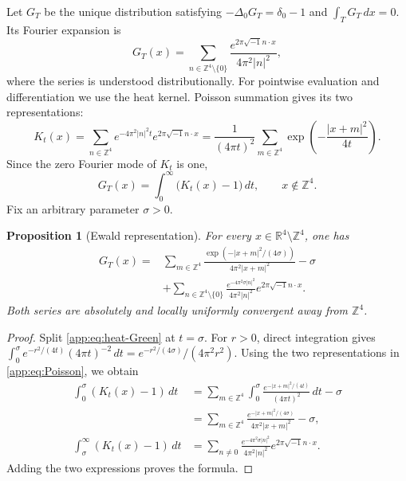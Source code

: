 \documentclass[11pt,a4paper,twoside]{article}
\numberwithin{equation}{section}
\newtheorem{proposition}[theorem]{Proposition}
\theoremstyle{definition}
\theoremstyle{remark}
\newcommand{\ii}{\sqrt{-1}}
\begin{document}
Let \(G_T\) be the unique distribution satisfying
\(-\Delta_0G_T=\delta_0-1\) and \(\int_TG_T\,dx=0\).
Its Fourier expansion is
\begin{equation}\label{app:eq:GT-Fourier}
G_T(x)=\sum_{n\in\mathbb Z^4\setminus\{0\}}
\frac{e^{2\pi\ii n\cdot x}}{4\pi^2|n|^2},
\end{equation}
where the series is understood distributionally. For pointwise
evaluation and differentiation we use the heat kernel. Poisson
summation gives its two representations:
\begin{equation}\label{app:eq:Poisson}
K_t(x)=\sum_{n\in\mathbb Z^4}e^{-4\pi^2|n|^2t}
e^{2\pi\ii n\cdot x}
=\frac1{(4\pi t)^2}\sum_{m\in\mathbb Z^4}
\exp\!\left(-\frac{|x+m|^2}{4t}\right).
\end{equation}
Since the zero Fourier mode of \(K_t\) is one,
\begin{equation}\label{app:eq:heat-Green}
G_T(x)=\int_0^\infty\bigl(K_t(x)-1\bigr)\,dt,
\qquad x\notin\mathbb Z^4.
\end{equation}
Fix an arbitrary parameter \(\sigma>0\).

\begin{proposition}[Ewald representation]
\label{app:prop:Ewald}
For every \(x\in\mathbb R^4\setminus\mathbb Z^4\), one has
\begin{equation}\label{app:eq:Ewald}
\begin{aligned}
G_T(x)={}&\sum_{m\in\mathbb Z^4}
\frac{\exp\!\left(-|x+m|^2/(4\sigma)\right)}
{4\pi^2|x+m|^2}-\sigma\\
&+\sum_{n\in\mathbb Z^4\setminus\{0\}}
\frac{e^{-4\pi^2\sigma|n|^2}}{4\pi^2|n|^2}
e^{2\pi\ii n\cdot x}.
\end{aligned}
\end{equation}
Both series are absolutely and locally uniformly convergent away
from \(\mathbb Z^4\).
\end{proposition}

\begin{proof}
Split \eqref{app:eq:heat-Green} at \(t=\sigma\). For \(r>0\),
direct integration gives
\(\int_0^\sigma e^{-r^2/(4t)}(4\pi t)^{-2}\,dt
=e^{-r^2/(4\sigma)}/(4\pi^2r^2)\).
Using the two representations in \eqref{app:eq:Poisson}, we obtain
\[
\begin{aligned}
\int_0^\sigma(K_t(x)-1)\,dt
&=\sum_{m\in\mathbb Z^4}\int_0^\sigma
\frac{e^{-|x+m|^2/(4t)}}{(4\pi t)^2}\,dt-\sigma\\
&=\sum_{m\in\mathbb Z^4}
\frac{e^{-|x+m|^2/(4\sigma)}}{4\pi^2|x+m|^2}-\sigma,\\
\int_\sigma^\infty(K_t(x)-1)\,dt
&=\sum_{n\ne0}\frac{e^{-4\pi^2\sigma|n|^2}}
{4\pi^2|n|^2}e^{2\pi\ii n\cdot x}.
\end{aligned}
\]
Adding the two expressions proves the formula.
\end{proof}
\end{document}
